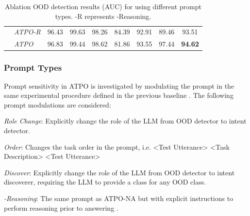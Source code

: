 \begin{table}[t!]
{\begin{tabular}{|c|l|ccccccc|}
                             &   \textit{ATPO-R}  &   96.43  &   99.63  &   98.26  &   84.39  &   92.91  &   89.46  &   \multicolumn{1}{|c|}{93.51}  \\ 
                            &   \textit{ATPO}  &   96.83  &  99.44  &   98.62  &  81.86  &  93.55  &   97.44  &  \multicolumn{1}{|c|}{\textbf{94.62}}  \\  \hline
\end{tabular}
}
\caption{Ablation OOD detection results (AUC) for \syst using different prompt types. \syst-R represents \syst-Reasoning.%
}
\label{tab:atpo_results-ptype-orig}
\end{table}

\subsubsection{Prompt Types}
Prompt sensitivity in ATPO is investigated by modulating the prompt in the same experimental procedure defined in the previous baseline \cite{wang2024beyond}. The following prompt modulations are considered:

\textit{Role Change}: Explicitly change the role of the LLM from OOD detector to intent detector.

\textit{Order}: Changes the task order in the prompt, i.e. <Test Utterance> <Task Description> <Test Utterance>

\textit{Discover}: Explicitly change the role of the LLM from OOD detector to intent discoverer, requiring the LLM to provide a class for any OOD class.
    
\textit{\syst-Reasoning}: The same prompt as ATPO-NA but with explicit instructions to perform reasoning prior to answering \citep{wei2022chain}.

